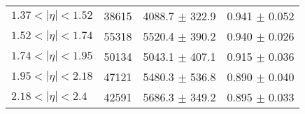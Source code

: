 \begin{tabular}{lccc}
$1.37 < |\eta| <1.52$          & 38615      & 4088.7     $\pm$ 322.9 & 0.941      $\pm$ 0.052 \\
$1.52 < |\eta| <1.74$          & 55318      & 5520.4     $\pm$ 390.2 & 0.940      $\pm$ 0.026 \\
$1.74 < |\eta| <1.95$          & 50134      & 5043.1     $\pm$ 407.1 & 0.915      $\pm$ 0.036 \\
$1.95 < |\eta| <2.18$          & 47121      & 5480.3     $\pm$ 536.8 & 0.890      $\pm$ 0.040 \\
$2.18 < |\eta| <2.4$           & 42591      & 5686.3     $\pm$ 349.2 & 0.895      $\pm$ 0.033 \\
\hline
\end{tabular}

